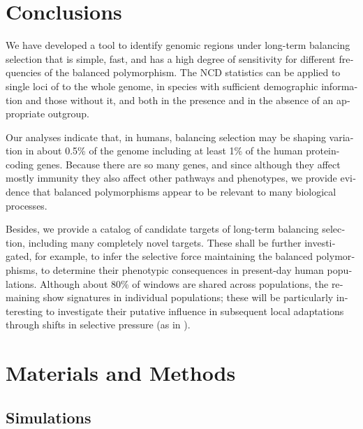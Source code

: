\begin{refsection}
\begin{otherlanguage}{english}
\section{Conclusions}
We have developed a tool to identify genomic regions under long-term balancing selection that is simple, fast, and has a high degree of sensitivity for different frequencies of the balanced polymorphism. The NCD statistics can be applied to single loci of to the whole genome, in species with sufficient demographic information and those without it, and both in the presence and in the absence of an appropriate outgroup.

Our analyses indicate that, in humans, balancing selection may be shaping variation in about 0.5\% of the genome including at least 1\% of the human protein-coding genes. Because there are so many genes, and since although they affect mostly immunity they also affect other pathways and phenotypes, we provide evidence that balanced polymorphisms appear to be relevant to many biological processes. %

Besides, we provide a catalog of candidate targets of long-term balancing selection, including many completely novel targets. These shall be further investigated, for example, to infer the selective force maintaining the balanced polymorphisms, to determine their phenotypic consequences in present-day human populations. Although about 80\% of windows are shared across populations, the remaining show signatures in individual populations; these will be particularly interesting to investigate their putative influence in subsequent local adaptations through shifts in selective pressure (as in \cite{DeFilippo2016}).


\section{Materials and Methods} %
\subsection{Simulations}


\end{otherlanguage}
\end{refsection}
